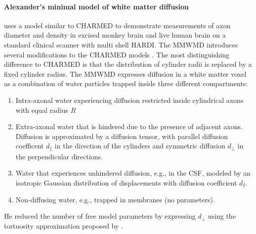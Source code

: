 \paragraph*{Alexander's minimal model of white matter diffusion} 
\label{par:alexanders_model}
\citet{Alexander:2010} uses a model similar to \gls{CHARMED} to demonstrate measurements of axon diameter and density in excised monkey brain and live human brain on a standard clinical scanner with multi shell \gls{HARDI}. The \gls{MMWMD} introduces several modifications to the \gls{CHARMED} models \citep{Dyrby:2010}. The most distinguishing  difference to \gls{CHARMED} is that the distribution of cylinder radii is replaced by a fixed cylinder radius. The \gls{MMWMD} expresses diffusion in a white matter voxel as a combination of water particles trapped inside three different compartments: 
\begin{enumerate}
  \item Intra-axonal water experiencing diffusion restricted inside cylindrical axons with equal radius $R$ \citep{Stepisnik:1993,Vangelderen:1994}
  \item Extra-axonal water that is hindered due to the presence of adjacent axons. Diffusion is approximated by a diffusion tensor, with parallel diffusion coefficent $d_\parallel$ in the direction of the cylinders and symmetric diffusion $d_\perp$ in the perpendicular directions.
  \item Water that experiences unhindered diffusion, e.g., in the {\gls{CSF}}, modeled by an isotropic Gaussian distribution of displacements with diffusion coefficient $d_{I}$.
  \item Non-diffusing water, e.g., trapped in membranes (no parameters).
\end{enumerate}
He reduced the number of free model parameters by expressing $d_\perp$ using the tortuosity approximation proposed by \citet{Szafer:1995}.

